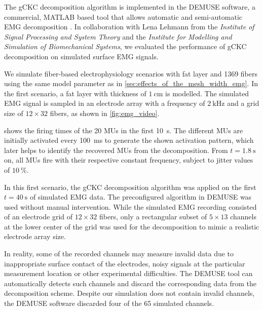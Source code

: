 The gCKC decomposition algorithm is implemented in the DEMUSE software, a commercial, MATLAB based tool that allows automatic and semi-automatic EMG decomposition \cite{demuse}. In collaboration with Lena Lehmann from the \emph{Institute of Signal Processing and System Theory} and the \emph{Institute for Modelling and Simulation of Biomechanical Systems}, we evaluated the performance of gCKC decomposition on simulated surface EMG signals.

We simulate fiber-based electrophysiology scenarios with fat layer and 1369 fibers using the same model parameter as in \cref{sec:effects_of_the_mesh_width_emg}. In the first scenario, a fat layer with thickness of $\SI{1}{\cm}$ is modelled. The simulated EMG signal is sampled in an electrode array with a frequency of $\SI{2}{\kilo\hertz}$ and a grid size of $12 \times 32$ fibers, as shown in \cref{fig:emg_video}.

 shows the firing times of the 20 MUs in the first \SI{10}{\second}. The different MUs are initially activated every \SI{100}{\ms} to generate the shown  activation pattern, which later helps to identify the recovered MUs from the decomposition.  From $t=\SI{1.8}{\second}$ on, all MUs fire with their respective constant frequency, subject to jitter values of $\SI{10}{\percent}$.

In this first scenario, the gCKC decomposition algorithm was applied on the first $t=\SI{40}{\second}$ of simulated EMG data. The preconfigured algorithm in DEMUSE was used without manual intervention. While the simulated EMG recording consisted of an electrode grid of $12 \times 32$ fibers, only a rectangular subset of $5\times 13$ channels at the lower center of the grid was used for the decomposition to mimic a realistic electrode array size. 

In reality, some of the recorded channels may measure invalid data due to inappropriate surface contact of the electrodes, noisy signals at the particular measurement location or other experimental difficulties. The DEMUSE tool can automatically detects such channels and discard the corresponding data from the decomposition scheme. Despite our simulation does not contain invalid channels, the DEMUSE software discarded four of the 65 simulated channels.

